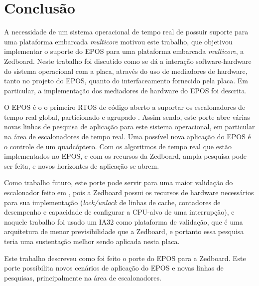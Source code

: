 \chapter{Conclusão}


A necessidade de um sistema operacional de tempo real de possuir suporte para uma plataforma embarcada \emph{multicore} motivou este trabalho, que objetivou implementar o suporte do EPOS para uma plataforma embarcada \emph{multicore}, a Zedboard.
Neste trabalho foi discutido como se dá a interação software-hardware do sistema operacional com a placa, através do uso de mediadores de hardware, tanto no projeto do EPOS, quanto do interfaceamento fornecido pela placa. Em particular, a implementação dos mediadores de hardware do EPOS foi descrita.


O EPOS é o o primeiro RTOS de código aberto a suportar os escalonadores de tempo real global, particionado e agrupado \cite{gio}. Assim sendo, este porte abre várias novas linhas de pesquisa de aplicação para este sistema operacional, em particular na área de escalonadores de tempo real.
Uma possível nova aplicação do EPOS é o controle de um quadcóptero. Com os algoritmos de tempo real que estão implementados no EPOS, e com os recursos da Zedboard, ampla pesquisa pode ser feita, e novos horizontes de aplicação se abrem.

Como trabalho futuro, este porte pode servir para uma maior validação do escalonador feito em \cite{gio}, pois a Zedboard possui os recursos de hardware necessários para sua implementação (\emph{lock/unlock} de linhas de cache, contadores de desempenho e capacidade de configurar a CPU-alvo de uma interrupção), e naquele trabalho foi usado um IA32 como plataforma de validação, que é uma arquitetura de menor previsibilidade que a Zedboard, e portanto essa pesquisa teria uma sustentação melhor sendo aplicada nesta placa.



Este trabalho descreveu como foi feito o porte do EPOS para a Zedboard. Este porte possibilita novos cenários de aplicação do EPOS e novas linhas de pesquisas, principalmente na área de escalonadores.
